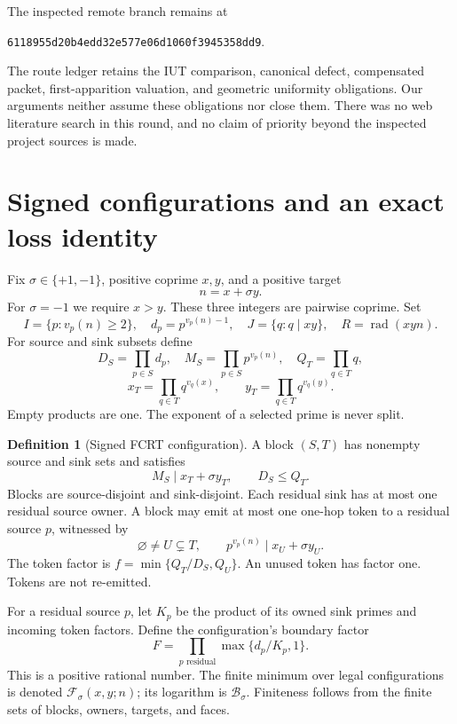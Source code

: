 \documentclass[11pt]{article}
\theoremstyle{definition}\newtheorem{definition}[theorem]{Definition}
\theoremstyle{remark}\newtheorem{remark}[theorem]{Remark}
\DeclareMathOperator{\rad}{rad}
\newcommand{\F}{\mathcal F}
\newcommand{\B}{\mathcal B}
\begin{document}
The inspected remote branch remains at
\begin{center}\small\texttt{6118955d20b4edd32e577e06d1060f3945358dd9}.\end{center}
The route ledger \cite{ledger} retains the IUT comparison, canonical defect, compensated packet, first-apparition valuation, and geometric uniformity obligations. Our arguments neither assume these obligations nor close them. There was no web literature search in this round, and no claim of priority beyond the inspected project sources is made.

\section{Signed configurations and an exact loss identity}
Fix \(\sigma\in\{+1,-1\}\), positive coprime \(x,y\), and a positive target
\[
 n=x+\sigma y.
\]
For \(\sigma=-1\) we require \(x>y\). These three integers are pairwise coprime. Set
\[
 I=\{p:v_p(n)\ge2\},\quad d_p=p^{v_p(n)-1},\quad
 J=\{q:q\mid xy\},\quad R=\rad(xyn).
\]
For source and sink subsets define
\[
 D_S=\prod_{p\in S}d_p,\quad M_S=\prod_{p\in S}p^{v_p(n)},\quad
 Q_T=\prod_{q\in T}q,
\]
\[
 x_T=\prod_{q\in T}q^{v_q(x)},\qquad
 y_T=\prod_{q\in T}q^{v_q(y)}.
\]
Empty products are one. The exponent of a selected prime is never split.

\begin{definition}[Signed FCRT configuration]
A block \((S,T)\) has nonempty source and sink sets and satisfies
\begin{equation}\label{eq:block}
 M_S\mid x_T+\sigma y_T,\qquad D_S\le Q_T.
\end{equation}
Blocks are source-disjoint and sink-disjoint. Each residual sink has at most one residual source owner. A block may emit at most one one-hop token to a residual source \(p\), witnessed by
\begin{equation}\label{eq:flag}
 \varnothing\ne U\subsetneq T,\qquad p^{v_p(n)}\mid x_U+\sigma y_U.
\end{equation}
The token factor is \(f=\min\{Q_T/D_S,Q_U\}\). An unused token has factor one. Tokens are not re-emitted.
\end{definition}
For a residual source \(p\), let \(K_p\) be the product of its owned sink primes and incoming token factors. Define the configuration's boundary factor
\[
 F=\prod_{p\text{ residual}}\max\{d_p/K_p,1\}.
\]
This is a positive rational number. The finite minimum over legal configurations is denoted \(\F_\sigma(x,y;n)\); its logarithm is \(\B_\sigma\). Finiteness follows from the finite sets of blocks, owners, targets, and faces.
\end{document}
